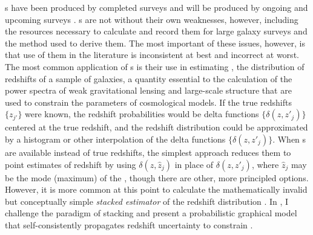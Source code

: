 

\Pzpdf s have been produced by completed surveys \citep{Hildebrandt2012, Sheldon2012} and will be produced by ongoing and upcoming surveys \citep{LSSTScienceCollaboration2009, CarrascoKind2014a, Bonnett2015, Masters2015}.  
\Pzpdf s are not without their own weaknesses, however, including the resources necessary to calculate and record them for large galaxy surveys \citep{CarrascoKind2014} and the method used to derive them.  
The most important of these issues, however, is that use of them in the literature is inconsistent at best and incorrect at worst.  
The most common application of \pzpdf s is their use in estimating \Nz, the distribution of redshifts of a sample of galaxies, a quantity essential to the calculation of the power spectra of weak gravitational lensing and large-scale structure that are used to constrain the parameters of cosmological models.
If the true redshifts $\{z_{j'}\}$ were known, the redshift probabilities would be delta functions $\{\delta(z, z'_{j})\}$ centered at the true redshift, and the redshift distribution could be approximated by a histogram or other interpolation of the delta functions $\{\delta(z, z'_{j})\}$.
When \pzpdf s are available instead of true redshifts, the simplest approach reduces them to point estimates of redshift by using $\delta(z, \hat{z}_{j})$ in place of $\delta(z, z'_{j})$, where $\hat{z}_{j}$ may be the mode (maximum) of the \pzpdf, though there are other, more principled options.
However, it is more common at this point to calculate the mathematically invalid but conceptually simple \textit{stacked estimator} of the redshift distribution \citep{Lima2008}.
In , I challenge the paradigm of stacking and present a probabilistic graphical model that self-consistently propagates redshift uncertainty to constrain \Nz.

